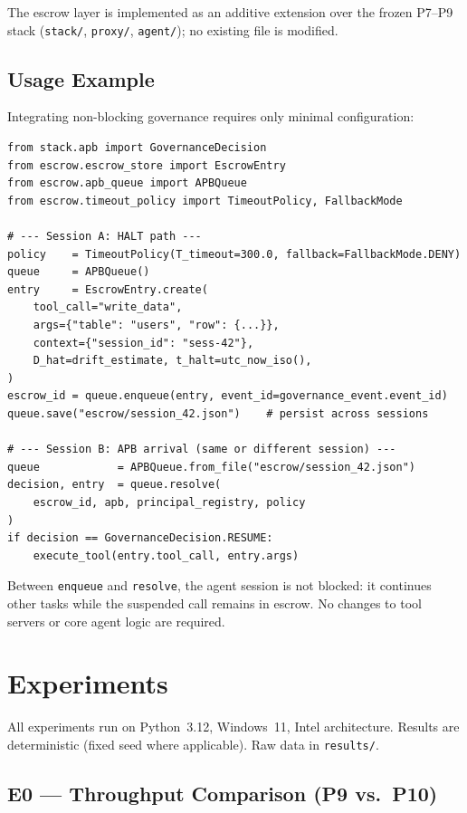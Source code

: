 \documentclass[11pt]{article}
\begin{document}
The escrow layer is implemented as an additive extension over the
frozen P7--P9 stack (\texttt{stack/}, \texttt{proxy/}, \texttt{agent/});
no existing file is modified.

\subsection{Usage Example}

Integrating non-blocking governance requires only minimal
configuration:

\begin{verbatim}
from stack.apb import GovernanceDecision
from escrow.escrow_store import EscrowEntry
from escrow.apb_queue import APBQueue
from escrow.timeout_policy import TimeoutPolicy, FallbackMode

# --- Session A: HALT path ---
policy    = TimeoutPolicy(T_timeout=300.0, fallback=FallbackMode.DENY)
queue     = APBQueue()
entry     = EscrowEntry.create(
    tool_call="write_data",
    args={"table": "users", "row": {...}},
    context={"session_id": "sess-42"},
    D_hat=drift_estimate, t_halt=utc_now_iso(),
)
escrow_id = queue.enqueue(entry, event_id=governance_event.event_id)
queue.save("escrow/session_42.json")    # persist across sessions

# --- Session B: APB arrival (same or different session) ---
queue            = APBQueue.from_file("escrow/session_42.json")
decision, entry  = queue.resolve(
    escrow_id, apb, principal_registry, policy
)
if decision == GovernanceDecision.RESUME:
    execute_tool(entry.tool_call, entry.args)
\end{verbatim}

Between \texttt{enqueue} and \texttt{resolve}, the agent session is
not blocked: it continues other tasks while the suspended call remains
in escrow. No changes to tool servers or core agent logic are required.

\section{Experiments}
\label{sec:experiments}

All experiments run on Python~3.12, Windows~11, Intel architecture.
Results are deterministic (fixed seed where applicable). Raw data
in \texttt{results/}.

\subsection{E0 --- Throughput Comparison (P9 vs.\ P10)}
\end{document}

